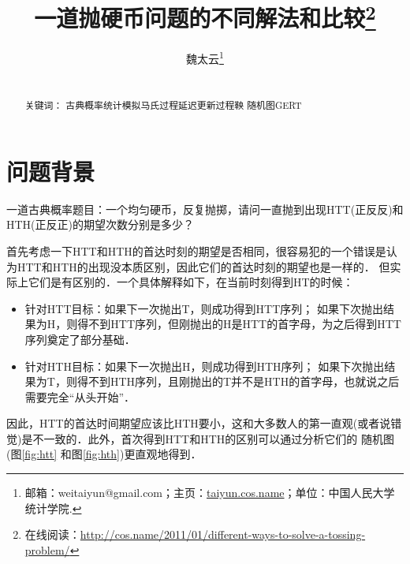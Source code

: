 \documentclass{article}
\begin{document}
\title{\heiti 一道抛硬币问题的不同解法和比较\thanks{在线阅读：\url{http://cos.name/2011/01/different-ways-to-solve-a-tossing-problem/}} }
\author{魏太云\thanks{邮箱：weitaiyun@gmail.com；主页：\url{taiyun.cos.name}；单位：中国人民大学统计学院.}}
%
\date{}
\maketitle

%
\begin{abstract}
\\

{\heiti 关键词：}  古典概率\quad  统计模拟\quad 马氏过程\quad  延迟更新过程\quad 鞅 \quad 随机图\quad GERT
\end{abstract}


\section{问题背景}
一道古典概率题目：一个均匀硬币，反复抛掷，请问一直抛到出现HTT(正反反)和HTH(正反正)的期望次数分别是多少？

首先考虑一下HTT和HTH的首达时刻的期望是否相同，很容易犯的一个错误是认为HTT和HTH的出现没本质区别，因此它们的首达时刻的期望也是一样的．
但实际上它们是有区别的．一个具体解释如下，在当前时刻得到HT的时候：
\begin{itemize}
\item 针对HTT目标：如果下一次抛出T，则成功得到HTT序列；
如果下次抛出结果为H，则得不到HTT序列，但刚抛出的H是HTT的首字母，为之后得到HTT序列奠定了部分基础．
\item 针对HTH目标：如果下一次抛出H，则成功得到HTH序列；
如果下次抛出结果为T，则得不到HTH序列，且刚抛出的T并不是HTH的首字母，也就说之后需要完全“从头开始”．
\end{itemize}

因此，HTT的首达时间期望应该比HTH要小，这和大多数人的第一直观(或者说错觉)是不一致的．此外，首次得到HTT和HTH的区别可以通过分析它们的
随机图(图\ref{fig:htt} 和图\ref{fig:hth})更直观地得到．
\end{document}
